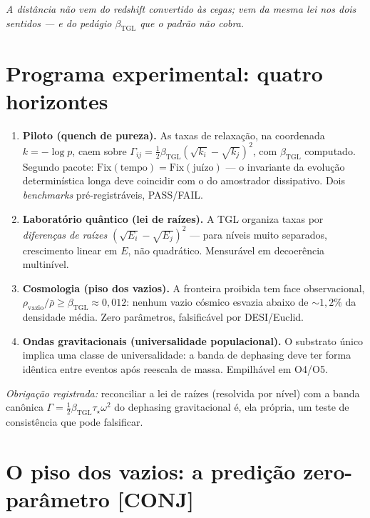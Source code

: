 \documentclass[11pt]{article}
\newcommand{\bTGL}{\beta_{\mathrm{TGL}}}\newcommand{\Msun}{M_{\odot}}\newcommand{\TGL}{\mathrm{TGL}}
\theoremstyle{definition}\newtheorem{deriv}{Derivação}
\begin{document}
\emph{A distância não vem do redshift convertido às cegas; vem da mesma lei nos dois sentidos --- e do pedágio $\bTGL$ que o padrão não cobra.}

\section{Programa experimental: quatro horizontes}\label{sec:horizontes}

\begin{enumerate}

\item \textbf{Piloto (quench de pureza).} As taxas de relaxação, na coordenada $k=-\log p$, caem sobre $\Gamma_{ij}=\tfrac12\bTGL(\sqrt{k_i}-\sqrt{k_j})^2$, com $\bTGL$ computado. Segundo pacote: $\mathrm{Fix}(\text{tempo})=\mathrm{Fix}(\text{juízo})$ --- o invariante da evolução determinística longa deve coincidir com o do amostrador dissipativo. Dois \emph{benchmarks} pré-registráveis, PASS/FAIL.

\item \textbf{Laboratório quântico (lei de raízes).} A TGL organiza taxas por \emph{diferenças de raízes} $(\sqrt{E_i}-\sqrt{E_j})^2$ --- para níveis muito separados, crescimento linear em $E$, não quadrático. Mensurável em decoerência multinível.

\item \textbf{Cosmologia (piso dos vazios).} A fronteira proibida tem face observacional, $\rho_{\mathrm{vazio}}/\bar\rho\geq\bTGL\approx0{,}012$: nenhum vazio cósmico esvazia abaixo de $\sim1{,}2\%$ da densidade média. Zero parâmetros, falsificável por DESI/Euclid.

\item \textbf{Ondas gravitacionais (universalidade populacional).} O substrato único implica uma classe de universalidade: a banda de dephasing deve ter forma idêntica entre eventos após reescala de massa. Empilhável em O4/O5.

\end{enumerate}

\emph{Obrigação registrada:} reconciliar a lei de raízes (resolvida por nível) com a banda canônica $\Gamma=\tfrac12\bTGL\tau_\star\omega^2$ do dephasing gravitacional é, ela própria, um teste de consistência que pode falsificar.

\section{O piso dos vazios: a predição zero-parâmetro \textsf{[CONJ]}}
\end{document}

